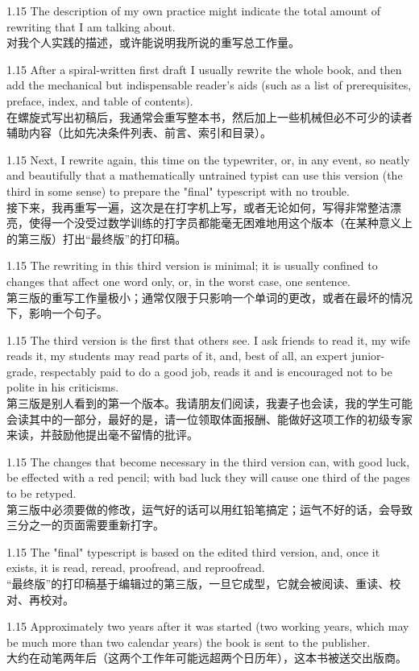 \documentclass[12pt,a4paper]{article}
\newcommand{\bilingual}[2]{
    \begin{spacing}{1.15} %
        \noindent \normalsize #1 \\[-0.5ex] %
        \small \textcolor{blue!70!black}{#2} %
    \end{spacing}
    \vspace{0.8em} %
}
\begin{document}
\bilingual{The description of my own practice might indicate the total amount of rewriting that I am talking about.}
{对我个人实践的描述，或许能说明我所说的重写总工作量。} %

\bilingual{After a spiral-written first draft I usually rewrite the whole book, and then add the mechanical but indispensable reader's aids (such as a list of prerequisites, preface, index, and table of contents).}
{在螺旋式写出初稿后，我通常会重写整本书，然后加上一些机械但必不可少的读者辅助内容（比如先决条件列表、前言、索引和目录）。} %

\bilingual{Next, I rewrite again, this time on the typewriter, or, in any event, so neatly and beautifully that a mathematically untrained typist can use this version (the third in some sense) to prepare the "final" typescript with no trouble.}
{接下来，我再重写一遍，这次是在打字机上写，或者无论如何，写得非常整洁漂亮，使得一个没受过数学训练的打字员都能毫无困难地用这个版本（在某种意义上的第三版）打出“最终版”的打印稿。} %

\bilingual{The rewriting in this third version is minimal; it is usually confined to changes that affect one word only, or, in the worst case, one sentence.}
{第三版的重写工作量极小；通常仅限于只影响一个单词的更改，或者在最坏的情况下，影响一个句子。} %

\bilingual{The third version is the first that others see. I ask friends to read it, my wife reads it, my students may read parts of it, and, best of all, an expert junior-grade, respectably paid to do a good job, reads it and is encouraged not to be polite in his criticisms.}
{第三版是别人看到的第一个版本。我请朋友们阅读，我妻子也会读，我的学生可能会读其中的一部分，最好的是，请一位领取体面报酬、能做好这项工作的初级专家来读，并鼓励他提出毫不留情的批评。} %

\bilingual{The changes that become necessary in the third version can, with good luck, be effected with a red pencil; with bad luck they will cause one third of the pages to be retyped.}
{第三版中必须要做的修改，运气好的话可以用红铅笔搞定；运气不好的话，会导致三分之一的页面需要重新打字。} %

\bilingual{The "final" typescript is based on the edited third version, and, once it exists, it is read, reread, proofread, and reproofread.}
{“最终版”的打印稿基于编辑过的第三版，一旦它成型，它就会被阅读、重读、校对、再校对。} %

\bilingual{Approximately two years after it was started (two working years, which may be much more than two calendar years) the book is sent to the publisher.}
{大约在动笔两年后（这两个工作年可能远超两个日历年），这本书被送交出版商。} %
\end{document}
